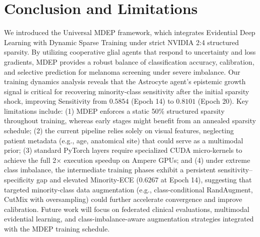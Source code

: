 \documentclass[letterpaper]{article} %
\begin{document}
\section{Conclusion and Limitations}\label{sec:conclusion}
We introduced the Universal MDEP framework, which integrates Evidential Deep Learning with Dynamic Sparse Training under strict NVIDIA 2:4 structured sparsity. By utilizing cooperative glial agents that respond to uncertainty and loss gradients, MDEP provides a robust balance of classification accuracy, calibration, and selective prediction for melanoma screening under severe imbalance. Our training dynamics analysis reveals that the Astrocyte agent's epistemic growth signal is critical for recovering minority-class sensitivity after the initial sparsity shock, improving Sensitivity from $0.5854$ (Epoch 14) to $0.8101$ (Epoch 20).
Key limitations include: (1) MDEP enforces a static 50\% structured sparsity throughout training, whereas early stages might benefit from an annealed sparsity schedule; (2) the current pipeline relies solely on visual features, neglecting patient metadata (e.g., age, anatomical site) that could serve as a multimodal prior; (3) standard PyTorch layers require specialized CUDA micro-kernels to achieve the full 2$\times$ execution speedup on Ampere GPUs; and (4) under extreme class imbalance, the intermediate training phases exhibit a persistent sensitivity--specificity gap and elevated Minority-ECE ($0.6267$ at Epoch 14), suggesting that targeted minority-class data augmentation (e.g., class-conditional RandAugment, CutMix with oversampling) could further accelerate convergence and improve calibration. Future work will focus on federated clinical evaluations, multimodal evidential learning, and class-imbalance-aware augmentation strategies integrated with the MDEP training schedule.
\end{document}
